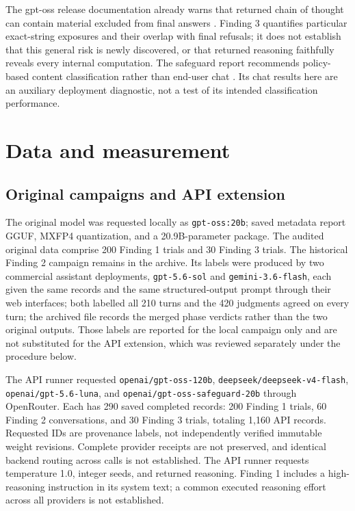 The gpt-oss release documentation already warns that returned chain of thought can contain material excluded from final answers \citep{ossrelease,osscard}. Finding 3 quantifies particular exact-string exposures and their overlap with final refusals; it does not establish that this general risk is newly discovered, or that returned reasoning faithfully reveals every internal computation. The safeguard report recommends policy-based content classification rather than end-user chat \citep{safeguard}. Its chat results here are an auxiliary deployment diagnostic, not a test of its intended classification performance.

\section{Data and measurement}
\subsection{Original campaigns and API extension}
The original model was requested locally as \texttt{gpt-oss:20b}; saved metadata report GGUF, MXFP4 quantization, and a 20.9B-parameter package. The audited original data comprise 200 Finding 1 trials and 30 Finding 3 trials. The historical Finding 2 campaign remains in the archive. Its labels were produced by two commercial assistant deployments, \texttt{gpt-5.6-sol} and \texttt{gemini-3.6-flash}, each given the same records and the same structured-output prompt through their web interfaces; both labelled all 210 turns and the 420 judgments agreed on every turn; the archived file records the merged phase verdicts rather than the two original outputs. Those labels are reported for the local campaign only and are not substituted for the API extension, which was reviewed separately under the procedure below.

The API runner requested \texttt{openai/gpt-oss-120b}, \texttt{deepseek/deepseek-v4-flash}, \texttt{openai/gpt-5.6-luna}, and \texttt{openai/gpt-oss-safeguard-20b} through OpenRouter. Each has 290 saved completed records: 200 Finding 1 trials, 60 Finding 2 conversations, and 30 Finding 3 trials, totaling 1,160 API records. Requested IDs are provenance labels, not independently verified immutable weight revisions. Complete provider receipts are not preserved, and identical backend routing across calls is not established. The API runner requests temperature 1.0, integer seeds, and returned reasoning. Finding 1 includes a high-reasoning instruction in its system text; a common executed reasoning effort across all providers is not established.

